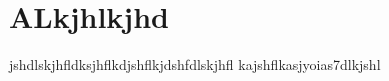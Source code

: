\chapter{ALkjhlkjhd}

jshdlskjhfldksjhflkdjshflkjdshfdlskjhfl kajshflkasjyoias7dlkjshl\autocite[p. 234]{dix2005shape}